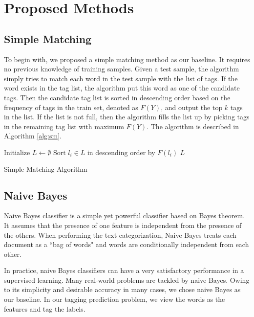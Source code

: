 \section{Proposed Methods}
\subsection{Simple Matching}
To begin with, we proposed a simple matching method as our baseline. It requires no previous knowledge of training samples. Given a test sample, the algorithm simply tries to match each word in the test sample with the list of tags. If the word exists in the tag list, the algorithm put this word as one of the candidate tags. Then the candidate tag list is sorted in descending order based on the frequency of tags in the train set, denoted as $F(Y)$, and output the top $k$ tags in the list. If the list is not full, then the algorithm fills the list up by picking tags in the remaining tag list with maximum $F(Y)$. The algorithm is described in Algorithm \ref{alg:sm}.

\IncMargin{1em}
\begin{algorithm}
\label{alg:sm}
\BlankLine
Initialize $L \leftarrow \emptyset$ \;
 {
}
Sort $l_i \in L$ in descending order by $F(l_i)$ \;
\Return $L$\;
\caption{Simple Matching Algorithm}\label{algo_disjdecomp}
\end{algorithm}
\DecMargin{1em}

\subsection{Naive Bayes}
Naive Bayes classifier is a simple yet powerful classifier based on Bayes theorem. It assumes that the presence of one feature is independent from the presence of the others. When performing the text categorization, Naive Bayes treats each document as a ``bag of words" and words are conditionally independent from each other.

In practice, naive Bayes classifiers can have a very satisfactory performance in a supervised learning. Many real-world problems are tackled by naive Bayes. Owing to its simplicity and desirable accuracy in many cases, we chose naive Bayes as our baseline. In our tagging prediction problem, we view the words as the features and tag the labels.

